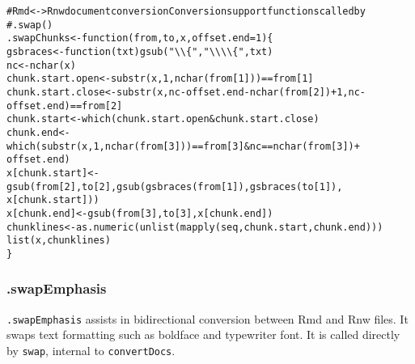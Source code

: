 \documentclass{article}\usepackage[]{graphicx}\usepackage[]{color}
\makeatletter
\newcommand{\hlnum}[1]{\textcolor[rgb]{0.863,0.196,0.184}{#1}}%
\newcommand{\hlstr}[1]{\textcolor[rgb]{0.863,0.196,0.184}{#1}}%
\newcommand{\hlcom}[1]{\textcolor[rgb]{0.345,0.431,0.459}{#1}}%
\newcommand{\hlopt}[1]{\textcolor[rgb]{0.576,0.631,0.631}{#1}}%
\newcommand{\hlstd}[1]{\textcolor[rgb]{0.514,0.58,0.588}{#1}}%
\newcommand{\hlkwa}[1]{\textcolor[rgb]{0.796,0.294,0.086}{#1}}%
\newcommand{\hlkwb}[1]{\textcolor[rgb]{0.522,0.6,0}{#1}}%
\newcommand{\hlkwc}[1]{\textcolor[rgb]{0.796,0.294,0.086}{#1}}%
\newcommand{\hlkwd}[1]{\textcolor[rgb]{0.576,0.631,0.631}{#1}}%
\newenvironment{kframe}{%
 \def\at@end@of@kframe{}%
 \ifinner\ifhmode%
  \def\at@end@of@kframe{\end{minipage}}%
  \begin{minipage}{\columnwidth}%
 \fi\fi%
 \def\FrameCommand##1{\hskip\@totalleftmargin \hskip-\fboxsep
 \colorbox{shadecolor}{##1}\hskip-\fboxsep
     \hskip-\linewidth \hskip-\@totalleftmargin \hskip\columnwidth}%
 \MakeFramed {\advance\hsize-\width
   \@totalleftmargin\z@ \linewidth\hsize
   \@setminipage}}%
 {\par\unskip\endMakeFramed%
 \at@end@of@kframe}
\newenvironment{knitrout}{}{} %
\makeatother
\begin{document}
\begin{knitrout}
\color{fgcolor}\begin{kframe}
\begin{alltt}
\hlcom{# Rmd <-> Rnw document conversion Conversion support functions called by}
\hlcom{# .swap()}
\hlstd{.swapChunks} \hlkwb{<-} \hlkwa{function}\hlstd{(}\hlkwc{from}\hlstd{,} \hlkwc{to}\hlstd{,} \hlkwc{x}\hlstd{,} \hlkwc{offset.end} \hlstd{=} \hlnum{1}\hlstd{) \{}
    \hlstd{gsbraces} \hlkwb{<-} \hlkwa{function}\hlstd{(}\hlkwc{txt}\hlstd{)} \hlkwd{gsub}\hlstd{(}\hlstr{"\textbackslash{}\textbackslash{}\{"}\hlstd{,} \hlstr{"\textbackslash{}\textbackslash{}\textbackslash{}\textbackslash{}\{"}\hlstd{, txt)}
    \hlstd{nc} \hlkwb{<-} \hlkwd{nchar}\hlstd{(x)}
    \hlstd{chunk.start.open} \hlkwb{<-} \hlkwd{substr}\hlstd{(x,} \hlnum{1}\hlstd{,} \hlkwd{nchar}\hlstd{(from[}\hlnum{1}\hlstd{]))} \hlopt{==} \hlstd{from[}\hlnum{1}\hlstd{]}
    \hlstd{chunk.start.close} \hlkwb{<-} \hlkwd{substr}\hlstd{(x, nc} \hlopt{-} \hlstd{offset.end} \hlopt{-} \hlkwd{nchar}\hlstd{(from[}\hlnum{2}\hlstd{])} \hlopt{+} \hlnum{1}\hlstd{, nc} \hlopt{-}
        \hlstd{offset.end)} \hlopt{==} \hlstd{from[}\hlnum{2}\hlstd{]}
    \hlstd{chunk.start} \hlkwb{<-} \hlkwd{which}\hlstd{(chunk.start.open} \hlopt{&} \hlstd{chunk.start.close)}
    \hlstd{chunk.end} \hlkwb{<-} \hlkwd{which}\hlstd{(}\hlkwd{substr}\hlstd{(x,} \hlnum{1}\hlstd{,} \hlkwd{nchar}\hlstd{(from[}\hlnum{3}\hlstd{]))} \hlopt{==} \hlstd{from[}\hlnum{3}\hlstd{]} \hlopt{&} \hlstd{nc} \hlopt{==} \hlkwd{nchar}\hlstd{(from[}\hlnum{3}\hlstd{])} \hlopt{+}
        \hlstd{offset.end)}
    \hlstd{x[chunk.start]} \hlkwb{<-} \hlkwd{gsub}\hlstd{(from[}\hlnum{2}\hlstd{], to[}\hlnum{2}\hlstd{],} \hlkwd{gsub}\hlstd{(}\hlkwd{gsbraces}\hlstd{(from[}\hlnum{1}\hlstd{]),} \hlkwd{gsbraces}\hlstd{(to[}\hlnum{1}\hlstd{]),}
        \hlstd{x[chunk.start]))}
    \hlstd{x[chunk.end]} \hlkwb{<-} \hlkwd{gsub}\hlstd{(from[}\hlnum{3}\hlstd{], to[}\hlnum{3}\hlstd{], x[chunk.end])}
    \hlstd{chunklines} \hlkwb{<-} \hlkwd{as.numeric}\hlstd{(}\hlkwd{unlist}\hlstd{(}\hlkwd{mapply}\hlstd{(seq, chunk.start, chunk.end)))}
    \hlkwd{list}\hlstd{(x, chunklines)}
\hlstd{\}}
\end{alltt}
\end{kframe}
\end{knitrout}

\subsubsection{.swapEmphasis}
\texttt{.swapEmphasis} assists in bidirectional conversion between Rmd and Rnw files.
It swaps text formatting such as boldface and typewriter font.
It is called directly by \texttt{swap}, internal to \texttt{convertDocs}.
\end{document}
